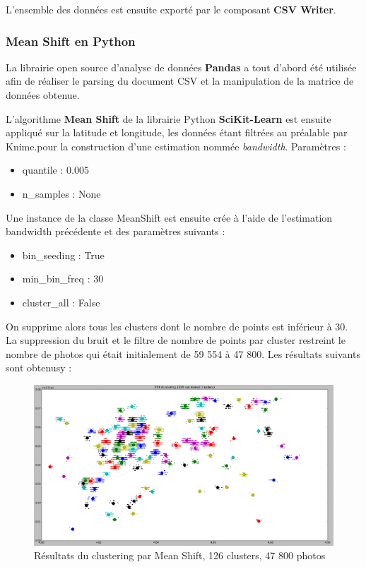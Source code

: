L'ensemble des données est ensuite exporté par le composant \textbf{CSV Writer}.

\subsubsection{Mean Shift en Python}
La librairie open source d'analyse de données \textbf{Pandas} a tout d'abord été utilisée afin de réaliser le parsing du document CSV et la manipulation de la matrice de données obtenue.

L'algorithme \textbf{Mean Shift} de la librairie Python \textbf{SciKit-Learn} est ensuite appliqué sur la latitude et longitude, les données étant filtrées au préalable par Knime.pour la construction d'une estimation nommée \textit{bandwidth}. Paramètres :
\begin{itemize}
    \item quantile : 0.005
    \item n\_samples : None
\end{itemize}

Une instance de la classe MeanShift est ensuite crée à l'aide de l'estimation bandwidth précédente et des paramètres suivants :
\begin{itemize}
    \item bin\_seeding : True
    \item min\_bin\_freq : 30
    \item cluster\_all : False
\end{itemize}

On supprime alors tous les clusters dont le nombre de points est inférieur à 30. La suppression du bruit et le filtre de nombre de points par cluster restreint le nombre de photos qui était initialement de 59 554 à 47 800.
Les résultats suivants sont obtenusy :
\begin{figure}[H]
    \centering
    \includegraphics[width=\linewidth]{img/meanshift.png}
    \caption{Résultats du clustering par Mean Shift, 126 clusters, 47 800 photos}
\end{figure}

